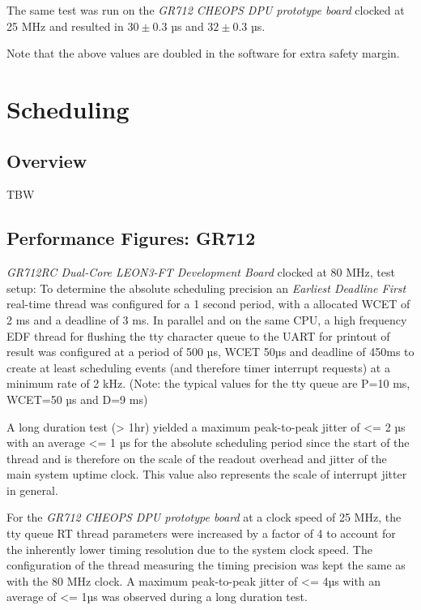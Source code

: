 The same test was run on the \emph{GR712 CHEOPS DPU prototype board} clocked
at 25 MHz and resulted in $30\pm 0.3$ µs and $32 \pm 0.3$ µs.

Note that the above values are doubled in the software for extra safety margin.


\chapter{Scheduling}

\section{Overview}

TBW


\section{Performance Figures: GR712}

\emph{GR712RC Dual-Core LEON3-FT Development Board} clocked at 80 MHz, test setup:
To determine the absolute scheduling precision an \emph{Earliest Deadline First}
real-time thread was configured for a 1 second period, with a
allocated WCET of 2 ms and a deadline of 3 ms. In parallel and on the same
CPU, a high frequency EDF thread for flushing the tty character queue to
the UART for printout of result was configured at a period of 500 µs, WCET 50µs
and deadline of 450ms to create at least scheduling events (and therefore timer
interrupt requests) at a minimum rate of 2 kHz.
(Note: the typical values for the tty queue are P=10 ms, WCET=50 µs and D=9 ms)

A long duration test (> 1hr) yielded a maximum peak-to-peak jitter of <= 2 µs with
an average <= 1 µs for the absolute scheduling period since the start of the thread
and is therefore
on the scale of the readout overhead and jitter of the main system uptime clock.
This value also represents the scale of interrupt jitter in general.

For the \emph{GR712 CHEOPS DPU prototype board} at a clock speed of
25 MHz, the tty queue RT thread parameters were increased by a factor of 4
to account for the inherently lower timing resolution due to the system clock speed.
The configuration of the thread measuring the timing precision was kept the same
as with the 80 MHz clock.
A maximum peak-to-peak jitter of <= 4µs with an average of <= 1µs was observed
during a long duration test.


